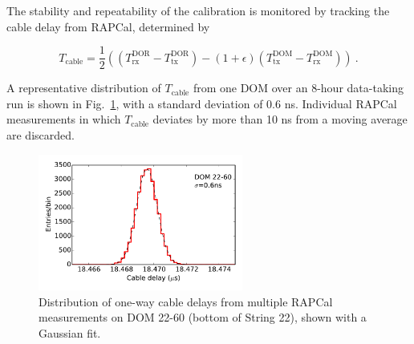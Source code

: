 The stability and repeatability of the calibration is monitored by
tracking the cable delay from RAPCal, determined by

\begin{equation}
  T_{\mathrm{cable}} = \frac{1}{2} \left( ( T_{\mathrm{rx}}^{\mathrm{DOR}} -
  T_{\mathrm{tx}}^{\mathrm{DOR}} ) - (1+\epsilon)(T_{\mathrm{tx}}^{\mathrm{DOM}} -
  T_{\mathrm{rx}}^{\mathrm{DOM}} )\right) \ .
\end{equation}

\noindent A representative distribution of $T_{\mathrm{cable}}$ from one DOM over an 8-hour
data-taking run is shown in Fig.~\ref{fig:rapcal_cable_len}, with a
standard deviation of 0.6 ns.  Individual RAPCal measurements in which $T_{\mathrm{cable}}$
deviates by more than 10 ns from a moving average are discarded.

\begin{figure}[!h]
 \centering
 \includegraphics[width=0.6\textwidth]{graphics/dom/rapcal/tcal_hist_22-60.pdf}
 \caption{Distribution of one-way cable delays from multiple RAPCal
   measurements on DOM 22-60 (bottom of String 22), shown with a Gaussian fit.}
 \label{fig:rapcal_cable_len}
\end{figure}

